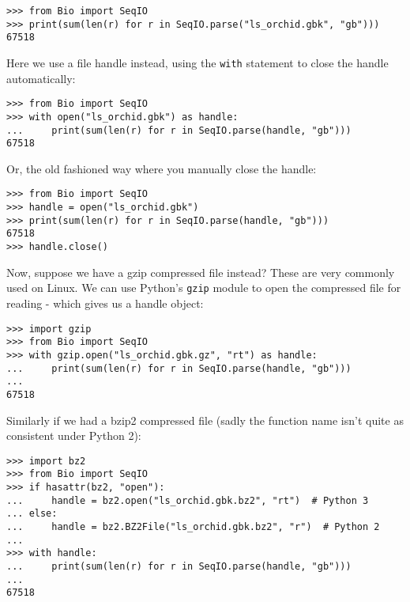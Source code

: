 \begin{verbatim}
>>> from Bio import SeqIO
>>> print(sum(len(r) for r in SeqIO.parse("ls_orchid.gbk", "gb")))
67518
\end{verbatim}

\noindent
Here we use a file handle instead, using the \verb|with| statement
to close the handle automatically:

\begin{verbatim}
>>> from Bio import SeqIO
>>> with open("ls_orchid.gbk") as handle:
...     print(sum(len(r) for r in SeqIO.parse(handle, "gb")))
67518
\end{verbatim}

\noindent
Or, the old fashioned way where you manually close the handle:

\begin{verbatim}
>>> from Bio import SeqIO
>>> handle = open("ls_orchid.gbk")
>>> print(sum(len(r) for r in SeqIO.parse(handle, "gb")))
67518
>>> handle.close()
\end{verbatim}

Now, suppose we have a gzip compressed file instead? These are very
commonly used on Linux. We can use Python's \verb|gzip| module to open
the compressed file for reading - which gives us a handle object:

\begin{verbatim}
>>> import gzip
>>> from Bio import SeqIO
>>> with gzip.open("ls_orchid.gbk.gz", "rt") as handle:
...     print(sum(len(r) for r in SeqIO.parse(handle, "gb")))
...
67518
\end{verbatim}

Similarly if we had a bzip2 compressed file (sadly the function name isn't
quite as consistent under Python 2):


\begin{verbatim}
>>> import bz2
>>> from Bio import SeqIO
>>> if hasattr(bz2, "open"):
...     handle = bz2.open("ls_orchid.gbk.bz2", "rt")  # Python 3
... else:
...     handle = bz2.BZ2File("ls_orchid.gbk.bz2", "r")  # Python 2
...
>>> with handle:
...     print(sum(len(r) for r in SeqIO.parse(handle, "gb")))
...
67518
\end{verbatim}

